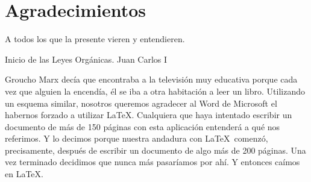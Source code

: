 %
%
%
%
%
%
%
%
%
%
%
%
%

\chapter{Agradecimientos}


\begin{FraseCelebre}
\begin{Frase}
A todos los que la presente vieren y entendieren.
\end{Frase}
\begin{Fuente}
Inicio de las Leyes Org\'anicas. Juan Carlos I
\end{Fuente}
\end{FraseCelebre}

Groucho Marx dec\'ia que encontraba a la televisi\'on muy educativa porque
cada vez que alguien la encend\'ia, \'el se iba a otra habitaci\'on a leer
un libro. Utilizando un esquema similar, nosotros queremos agradecer
al Word de Microsoft el habernos forzado a utilizar \LaTeX. Cualquiera
que haya intentado escribir un documento de m\'as de 150 p\'aginas con
esta aplicaci\'on entender\'a a qu\'e nos referimos. Y lo decimos porque
nuestra andadura con \LaTeX\ comenz\'o, precisamente, despu\'es de
escribir un documento de algo m\'as de 200 p\'aginas. Una vez terminado
decidimos que nunca m\'as pasar\'iamos por ah\'i. Y entonces ca\'imos en
\LaTeX.

